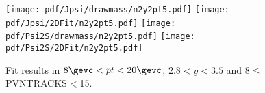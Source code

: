 \begin{figure}[H]
\begin{center}
\texttt{[image: pdf/Jpsi/drawmass/n2y2pt5.pdf]}
\texttt{[image: pdf/Jpsi/2DFit/n2y2pt5.pdf]}
\vspace*{-0.5cm}
\texttt{[image: pdf/Psi2S/drawmass/n2y2pt5.pdf]}
\texttt{[image: pdf/Psi2S/2DFit/n2y2pt5.pdf]}
\vspace*{-0.5cm}
\end{center}
\caption{Fit results in $8\gevc<pt<20\gevc$, $2.8<y<3.5$ and 8$\leq$PVNTRACKS$<$15.}
\label{Fitn2y2pt5}
\end{figure}
